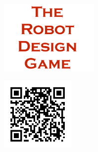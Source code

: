 \documentclass[11pt]{article}
\begin{document}
            
	
	\begin{center}
		\vfill
		\vfill
		\vfill

		\includegraphics[height=3.6cm]{rdg_logo}%
		
		\vfill

		\includegraphics[height=3.6cm]{led-qr}%

		\vfill
	\end{center}
\end{document}
